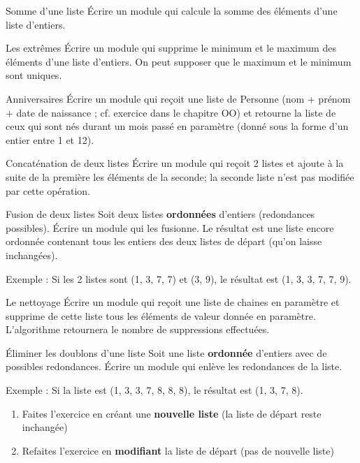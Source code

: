 \begin{Exercice}{Somme d'une liste}
	Écrire un module qui calcule la somme des éléments d’une liste
	d’entiers.
\end{Exercice}

\begin{Exercice}{Les extrêmes}
		Écrire un module qui supprime le minimum et le maximum des éléments
		d’une liste d’entiers. On peut supposer que le maximum et le minimum
		sont uniques.
\end{Exercice}

\begin{Exercice}{Anniversaires}
		Écrire un module qui reçoit une liste de Personne (nom + prénom + date
		de naissance ; cf. exercice dans le chapitre OO) et retourne la liste
		de ceux qui sont nés durant un mois passé en paramètre (donné sous la 
		forme d'un entier entre 1	et 12).
\end{Exercice}
	
\begin{Exercice}{Concaténation de deux listes}
		Écrire un module qui reçoit 2 listes et ajoute
		à la suite de la première les éléments de la seconde; la seconde liste
		n'est pas modifiée par cette opération.
\end{Exercice}

\begin{Exercice}{Fusion de deux listes}
		Soit deux listes \textbf{ordonnées}
		d'entiers (redondances possibles). Écrire un module
		qui les fusionne. Le résultat est une liste encore ordonnée contenant
		tous les entiers des deux listes de départ (qu'on
		laisse inchangées).

		Exemple : Si les 2 listes sont (1, 3, 7, 7) et (3, 9), 
		le résultat est (1, 3, 3, 7, 7, 9).
\end{Exercice}

\begin{Exercice}{Le nettoyage}
	Écrire un module qui reçoit une liste de chaines en paramètre et
	supprime de cette liste tous les éléments de valeur donnée en
	paramètre. L'algorithme retournera le nombre de
	suppressions effectuées.
\end{Exercice}
	
\begin{Exercice}{Éliminer les doublons d'une liste}
		Soit une liste \textbf{ordonnée} 
		d'entiers avec de possibles redondances. Écrire un
		module qui enlève les redondances de la liste.
				
		Exemple : Si la liste est (1, 3, 3, 7, 8, 8, 8),
		le résultat est (1, 3, 7, 8).

		\begin{enumerate}[label=\alph*)]
			\item 
				Faites l'exercice en créant une \textbf{nouvelle
				liste} (la liste de départ reste inchangée)
			\item 
				Refaites l'exercice en \textbf{modifiant}
				la liste de départ (pas de nouvelle liste)
		\end{enumerate}
\end{Exercice}

